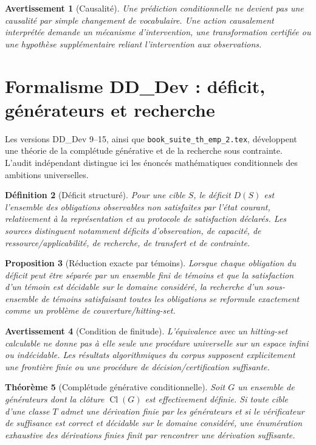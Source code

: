 \documentclass[11pt,a4paper,openany]{book}
\newtheorem{definition}{Définition}[chapter]
\newtheorem{proposition}[definition]{Proposition}
\newtheorem{theorem}[definition]{Théorème}
\newtheorem{warning}[definition]{Avertissement}
\begin{document}
\begin{warning}[Causalité]
Une prédiction conditionnelle ne devient pas une causalité par simple changement de vocabulaire. Une action causalement interprétée demande un mécanisme d'intervention, une transformation certifiée ou une hypothèse supplémentaire reliant l'intervention aux observations.
\end{warning}

\section{Formalisme DD\_Dev : déficit, générateurs et recherche}

Les versions DD\_Dev 9--15, ainsi que \texttt{book\_suite\_th\_emp\_2.tex}, développent une théorie de la complétude générative et de la recherche sous contrainte. L'audit indépendant distingue ici les énoncés mathématiques conditionnels des ambitions universelles.

\begin{definition}[Déficit structuré]
Pour une cible \(S\), le déficit \(D(S)\) est l'ensemble des obligations observables non satisfaites par l'état courant, relativement à la représentation et au protocole de satisfaction déclarés. Les sources distinguent notamment déficits d'observation, de capacité, de ressource/applicabilité, de recherche, de transfert et de contrainte.
\end{definition}

\begin{proposition}[Réduction exacte par témoins]
Lorsque chaque obligation du déficit peut être séparée par un ensemble fini de témoins et que la satisfaction d'un témoin est décidable sur le domaine considéré, la recherche d'un sous-ensemble de témoins satisfaisant toutes les obligations se reformule exactement comme un problème de couverture/hitting-set.
\end{proposition}

\begin{warning}[Condition de finitude]
L'équivalence avec un hitting-set calculable ne donne pas à elle seule une procédure universelle sur un espace infini ou indécidable. Les résultats algorithmiques du corpus supposent explicitement une frontière finie ou une procédure de décision/certification suffisante.
\end{warning}

\begin{theorem}[Complétude générative conditionnelle]
Soit \(G\) un ensemble de générateurs dont la clôture \(\operatorname{Cl}(G)\) est effectivement définie. Si toute cible d'une classe \(T\) admet une dérivation finie par les générateurs et si le vérificateur de suffisance est correct et décidable sur le domaine considéré, une énumération exhaustive des dérivations finies finit par rencontrer une dérivation suffisante.
\end{theorem}
\end{document}
